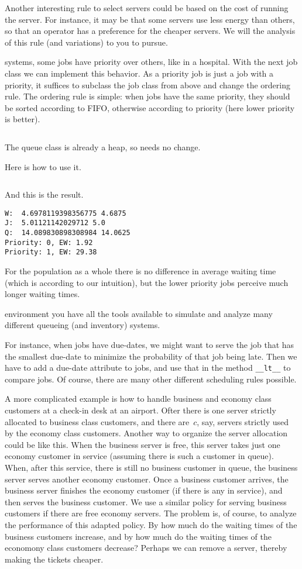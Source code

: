 \documentclass[stochastic-or.tex]{subfiles}
\begin{document}
Another interesting rule to select servers could be based on the cost of running the server.
For instance, it may be that some servers use less energy than others, so that an operator has a preference for the cheaper servers.
We will the analysis of this rule (and variations)  to you to pursue.

 systems, some jobs have priority over others, like in a hospital.
With the next job class we can implement this behavior.
As a priority job is just a job with a priority, it suffices to subclass the job class from above and change the ordering rule.
The ordering rule is simple: when jobs have the same priority, they should be sorted according to FIFO, otherwise according to priority (here lower priority is better).
\inputminted[label=priority-job.py]{python}{../code/event_stacks/priority_job.py}




The queue class is already a heap, so needs no change.

Here is how to use it.
\inputminted[label=priority-jobs.py]{python}{../code/event_stacks/priority_jobs.py}
And this is the result.
\begin{verbatim}
W:  4.6978119398356775 4.6875
J:  5.01121142029712 5.0
Q:  14.089830898308984 14.0625
Priority: 0, EW: 1.92
Priority: 1, EW: 29.38
\end{verbatim}
For the population as a whole there is no difference in average waiting time (which is according to our intuition), but the lower priority jobs perceive much longer waiting times.


 environment you have all the tools available to simulate and analyze many different queueing (and inventory) systems.

For instance, when jobs have due-dates, we might want to serve the job that has the smallest due-date to minimize the probability of that job being late.
Then we have to add a due-date attribute to jobs, and use that in the method \texttt{__lt__}  to compare jobs.
Of course, there are many other different scheduling rules possible.

A more complicated example is how to handle business and economy class customers at a check-in desk at an airport.
Ofter there is one server strictly allocated to business class customers, and there are~$c$, say, servers strictly used by the economy class customers.
Another way to organize the server allocation could be like this.
When the business server is free, this server takes just one economy customer in service (assuming there is such a customer in queue).
When, after this service, there is still no business customer in queue, the business server serves another economy customer.
Once a business customer arrives, the business server finishes the economy customer (if there is any in service), and then serves the business customer.
We use a similar policy for serving business customers if there are free economy servers.
The problem is, of course, to analyze the performance of this adapted policy.
By how much do the waiting times of the business customers increase, and by how much do the waiting times of the economony class customers decrease? Perhaps  we can remove a server, thereby making the tickets cheaper.
\end{document}
